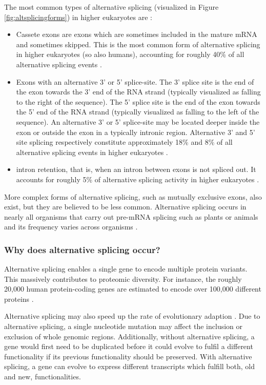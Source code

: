 The most common types of alternative splicing (visualized in Figure \ref{fig:altsplicingforms}) in higher eukaryotes are \cite{commonsplicing1}\cite{commonsplicing2}:
\begin{itemize}
	\item Cassete exons are exons which are sometimes included in the mature mRNA and sometimes skipped. This is the most common form of alternative splicing in higher eukaryotes (so also humans), accounting for roughly 40\% of all alternative splicing events \cite{splicing_current_perspectives}.
	\item Exons with an alternative 3' or 5' splice-site. The 3' splice site is the end of the exon towards the 3' end of the RNA strand (typically visualized as falling to the right of the sequence). The 5' splice site is the end of the exon towards the 5' end of the RNA strand (typically visualized as falling to the left of the sequence). An alternative 3' or 5' splice-site may be located deeper inside the exon or outside the exon in a typically intronic region. Alternative 3' and 5' site splicing respectively constitute approximately 18\% and 8\% of all alternative splicing events in higher eukaryotes \cite{splicing_current_perspectives}. 
	\item intron retention, that is, when an intron between exons is not spliced out. It accounts for roughly 5\% of alternative splicing activity in higher eukaryotes \cite{splicing_current_perspectives}.
\end{itemize}



More complex forms of alternative splicing, such as mutually exclusive exons, also exist, but they are believed to be less common. Alternative splicing occurs in nearly all organisms that carry out pre-mRNA splicing such as plants or animals and its frequency varies across organisms \cite{splicing_current_perspectives}. 
\subsubsection{Why does alternative splicing occur?}
Alternative splicing enables a single gene to encode multiple protein variants. This massively contributes to proteomic diversity. For instance, the roughly 20,000 human protein-coding genes are estimated to encode over 100,000 different proteins \cite{splicing_current_perspectives}.

Alternative splicing may also speed up the rate of evolutionary adaption \cite{whygenesinpieces} \cite{whyrevisited}. Due to alternative splicing, a single nucleotide mutation may affect the inclusion or exclusion of whole genomic regions. Additionally, without alternative splicing, a gene would first need to be duplicated before it could evolve to fulfil a different functionality if its previous functionality should be preserved. With alternative splicing, a gene can evolve to express different transcripts which fulfill both, old and new, functionalities. 


